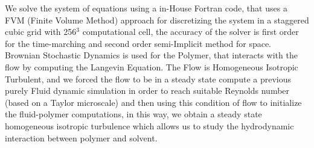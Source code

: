 \documentclass[a0paper,portrait]{baposter}
\begin{document}
\begin{poster}
{\footnotesize{
We solve the system of equations using a in-House Fortran code, that uses a FVM (Finite Volume
Method) approach for discretizing the system in a staggered cubic grid with 256$^3$ computational cell,
the accuracy of the solver is first order for the time-marching and second order semi-Implicit method
for space. Brownian Stochastic Dynamics is used for the Polymer, that interacts with the flow by
computing the Langevin Equation. The Flow is Homogeneous Isotropic Turbulent, and we forced the
flow to be in a steady state compute a previous purely Fluid dynamic simulation in order to reach 
suitable Reynolds number (based on a Taylor microscale) and then using this condition of flow to
initialize the fluid-polymer computations, in this way, we obtain a steady state homogeneous isotropic
turbulence which allows us to study the hydrodynamic interaction between polymer and solvent.%
}




}
\end{poster}
\end{document}
